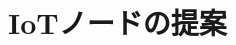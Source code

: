 \documentclass[submit,techrep,noauthor]{ipsj}
\def\|{\verb|}
\begin{document}
% 4.6.3
% \subsubsection{謝辞}

%  謝辞がある場合には，
%  参考文献リストの直前に置き，
%  \|acknowledgment|環境の中に入れる．

\section{IoTノードの提案}



\end{document}
